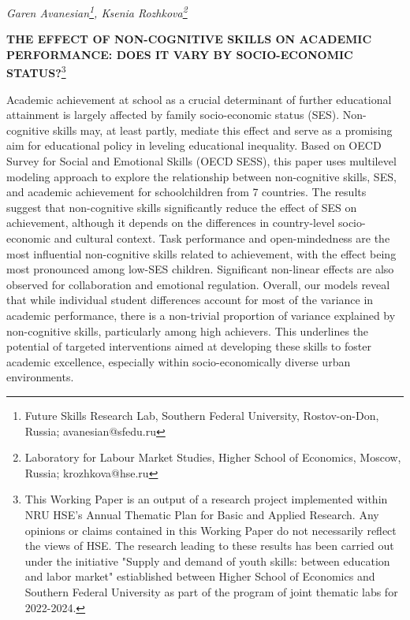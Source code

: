 \documentclass[
  12pt,
  a4paper,
]{article}
\author{}
\date{\vspace{-2.5em}}
\begin{document}
\thispagestyle{empty}

\begin{center}
\textit{Garen Avanesian\footnote{Future Skills Research Lab, Southern Federal University, Rostov-on-Don, Russia; avanesian@sfedu.ru},  Ksenia Rozhkova\footnote{Laboratory for Labour Market Studies, Higher School of Economics, Moscow, Russia; krozhkova@hse.ru}}
\end{center}

\begin{center}
\large\textbf{THE EFFECT OF NON-COGNITIVE SKILLS ON ACADEMIC PERFORMANCE: DOES IT VARY BY SOCIO-ECONOMIC STATUS?}\footnote{This Working Paper is an output of a research project implemented within NRU HSE’s Annual Thematic Plan for Basic and Applied Research. Any opinions or claims contained in this Working Paper do not necessarily reflect the views of HSE.
The research leading to these results has been carried out under the initiative "Supply and demand of youth skills: between education and labor market" estiablished between Higher School of Economics and Southern Federal University as part of the program of joint thematic labs for 2022-2024.}
\end{center}

Academic achievement at school as a crucial determinant of further
educational attainment is largely affected by family socio-economic
status (SES). Non-cognitive skills may, at least partly, mediate this
effect and serve as a promising aim for educational policy in leveling
educational inequality. Based on OECD Survey for Social and Emotional
Skills (OECD SESS), this paper uses multilevel modeling approach to
explore the relationship between non-cognitive skills, SES, and academic
achievement for schoolchildren from 7 countries. The results suggest
that non-cognitive skills significantly reduce the effect of SES on
achievement, although it depends on the differences in country-level
socio-economic and cultural context. Task performance and
open-mindedness are the most influential non-cognitive skills related to
achievement, with the effect being most pronounced among low-SES
children. Significant non-linear effects are also observed for
collaboration and emotional regulation. Overall, our models reveal that
while individual student differences account for most of the variance in
academic performance, there is a non-trivial proportion of variance
explained by non-cognitive skills, particularly among high achievers.
This underlines the potential of targeted interventions aimed at
developing these skills to foster academic excellence, especially within
socio-economically diverse urban environments.
\end{document}
